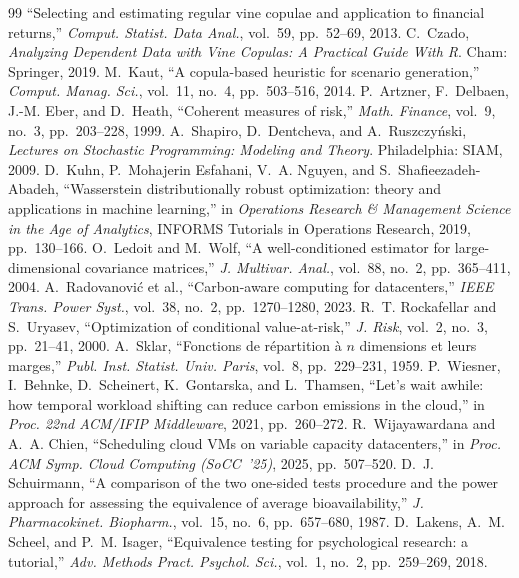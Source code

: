 \documentclass[12pt]{article}
\begin{document}
\begin{thebibliography}{99}
``Selecting and estimating regular vine copulae and application to financial
returns,'' \emph{Comput. Statist. Data Anal.}, vol.~59, pp.~52--69, 2013.
 C.~Czado, \emph{Analyzing Dependent Data with Vine Copulas: A
Practical Guide With R}. Cham: Springer, 2019.
 M.~Kaut, ``A copula-based heuristic for scenario generation,''
\emph{Comput. Manag. Sci.}, vol.~11, no.~4, pp.~503--516, 2014.
 P.~Artzner, F.~Delbaen, J.-M. Eber, and D.~Heath, ``Coherent
measures of risk,'' \emph{Math. Finance}, vol.~9, no.~3, pp.~203--228, 1999.
 A.~Shapiro, D.~Dentcheva, and A.~Ruszczy\'nski, \emph{Lectures
on Stochastic Programming: Modeling and Theory}. Philadelphia: SIAM, 2009.
 D.~Kuhn, P.~Mohajerin Esfahani, V.~A. Nguyen, and
S.~Shafieezadeh-Abadeh, ``Wasserstein distributionally robust optimization: theory
and applications in machine learning,'' in \emph{Operations Research \& Management
Science in the Age of Analytics}, INFORMS Tutorials in Operations Research, 2019,
pp.~130--166.
 O.~Ledoit and M.~Wolf, ``A well-conditioned estimator for
large-dimensional covariance matrices,'' \emph{J. Multivar. Anal.}, vol.~88,
no.~2, pp.~365--411, 2004.
 A.~Radovanovi\'c et al., ``Carbon-aware computing for
datacenters,'' \emph{IEEE Trans. Power Syst.}, vol.~38, no.~2, pp.~1270--1280,
2023.
 R.~T. Rockafellar and S.~Uryasev, ``Optimization of
conditional value-at-risk,'' \emph{J. Risk}, vol.~2, no.~3, pp.~21--41, 2000.
 A.~Sklar, ``Fonctions de r\'epartition \`a $n$ dimensions et
leurs marges,'' \emph{Publ. Inst. Statist. Univ. Paris}, vol.~8, pp.~229--231,
1959.
 P.~Wiesner, I.~Behnke, D.~Scheinert, K.~Gontarska, and
L.~Thamsen, ``Let's wait awhile: how temporal workload shifting can reduce carbon
emissions in the cloud,'' in \emph{Proc. 22nd ACM/IFIP Middleware}, 2021,
pp.~260--272.
 R.~Wijayawardana and A.~A. Chien, ``Scheduling cloud
VMs on variable capacity datacenters,'' in \emph{Proc. ACM Symp. Cloud Computing
(SoCC~'25)}, 2025, pp.~507--520.
 D.~J. Schuirmann, ``A comparison of the two one-sided tests
procedure and the power approach for assessing the equivalence of average
bioavailability,'' \emph{J. Pharmacokinet. Biopharm.}, vol.~15, no.~6,
pp.~657--680, 1987.
 D.~Lakens, A.~M. Scheel, and P.~M. Isager, ``Equivalence
testing for psychological research: a tutorial,'' \emph{Adv. Methods Pract. Psychol.
Sci.}, vol.~1, no.~2, pp.~259--269, 2018.
\end{thebibliography}
\end{document}

